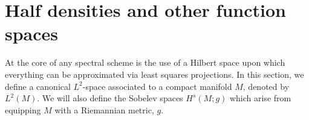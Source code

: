 \documentclass[final,leqno]{siamltex1213}
\begin{document}
%
%

\section{Half densities and other function spaces}
\label{sec:half densities}

At the core of any spectral scheme is the use of a Hilbert space upon which everything can be approximated via least squares projections.
In this section, we define a canonical $L^{2}$-space associated to a compact manifold $M$, denoted by $L^{2}(M)$.
We will also define the Sobelev spaces $H^{s}(M ; g)$ which arise from equipping $M$ with a Riemannian metric, $g$.
\end{document}
